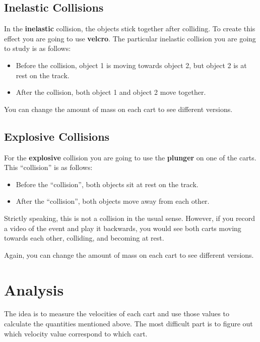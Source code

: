 \subsection{Inelastic Collisions}
In the \textbf{inelastic} collision, the objects stick together after colliding. To create this effect you are going to use \textbf{velcro}. The particular inelastic collision you are going to study is as follows:
\begin{itemize}
    \item Before the collision, object 1 is moving towards object 2, but object 2 is at rest on the track.
    \item After the collision, both object 1 and object 2 move together.
\end{itemize}
You can change the amount of mass on each cart to see different versions.
\subsection{Explosive Collisions}
For the \textbf{explosive} collision you are going to use the \textbf{plunger} on one of the carts. This ``collision'' is as follows:
\begin{itemize}
    \item Before the ``collision'', both objects sit at rest on the track.
    \item After the ``collision'', both objects move away from each other.
\end{itemize}
Strictly speaking, this is not a collision in the usual sense. However, if you record a video of the event and play it backwards, you would see both carts moving towards each other, colliding, and becoming at rest.

Again, you can change the amount of mass on each cart to see different versions.
\section{Analysis}
The idea is to measure the velocities of each cart and use those values to calculate the quantities mentioned above. The most difficult part is to figure out which velocity value correspond to which cart.

